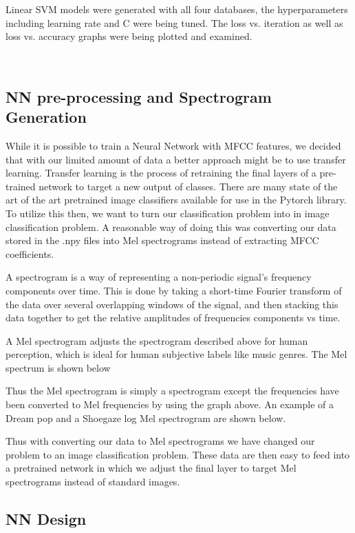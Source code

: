 \documentclass[letterpaper, 12 pt, conference]{ieeeconf}  %
\begin{document}
Linear SVM models were generated with all four databases, the hyperparameters including learning rate and C were being tuned. The loss vs. iteration as well as loss vs. accuracy graphs were being plotted and examined. 

\newline \,\,

\subsection{NN pre-processing and Spectrogram Generation}

While it is possible to train a Neural Network with MFCC features, we decided that with our limited amount of data a better approach might be to use transfer learning. Transfer learning is the process of retraining the final layers of a pre-trained network to target a new output of classes. There are many state of the art of the art pretrained image classifiers available for use in the Pytorch library. To utilize this then, we want to turn our classification problem into in image classification problem. A reasonable way of doing this was converting our data stored in the .npy files into Mel spectrograms instead of extracting MFCC coefficients.

A spectrogram is a way of representing a non-periodic signal’s frequency components over time. This is done by taking a short-time Fourier transform of the data over several overlapping windows of the signal, and then stacking this data together to get the relative amplitudes of frequencies components vs time. 

A Mel spectrogram adjusts the spectrogram described above for human perception, which is ideal for human subjective labels like music genres. The Mel spectrum is shown below


Thus the Mel spectrogram is simply a spectrogram except the frequencies have been converted to Mel frequencies by using the graph above. An example of a Dream pop and a Shoegaze log Mel spectrogram are shown below.


Thus with converting our data to Mel spectrograms we have changed our problem to an image classification problem. These data are then easy to feed into a pretrained network in which we adjust the final layer to target Mel spectrograms instead of standard images. 

\subsection{NN Design}
\end{document}
